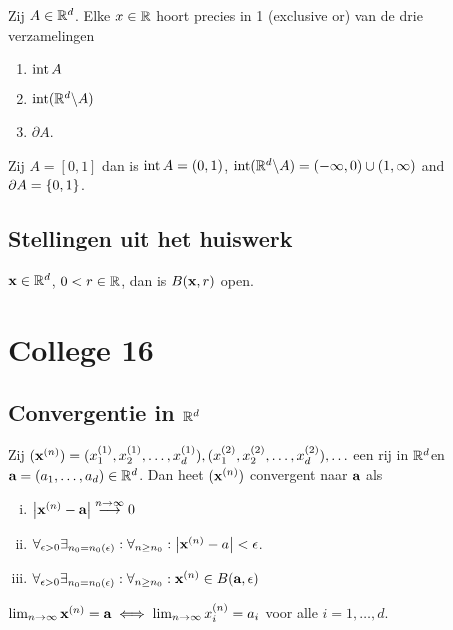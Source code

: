 \documentclass{2wa40summary}
\begin{document}
	\begin{lemma}
		Zij $A\in\mathbb{R}^d$.
		Elke $x \in \mathbb{R}$ hoort precies in 1 (exclusive or) van de drie verzamelingen
		\begin{enumerate}
			\item $\operatorname{\mathop{int}} A$
			\item $\operatorname{\mathop{int}} (\mathbb{R}^d\backslash A)$
			\item $\partial A$.
		\end{enumerate}
	\end{lemma}
	\begin{voorbeeld}
		Zij $A = [0,1]$ dan is $\operatorname{\mathop{int}} A=(0,1)$, $\operatorname{\mathop{int}} (\mathbb{R}^d\backslash A)=(-\infty,0)\cup(1,\infty)$
		and $\partial A = \lbrace0,1\rbrace$.
	\end{voorbeeld}
	
	\subsection{Stellingen uit het huiswerk}
	\begin{theorem}
		${\textbf{x}} \in \mathbb{R}^d$, $0<r\in\mathbb{R}$, dan is $B({\textbf{x}},r)$ open.
	\end{theorem}
	\newpage
	\section{College 16}
	\subsection{Convergentie in $\mathbb{R}^d$}
	\begin{define}
		Zij $({\textbf{x}}^{(n)}) = (x^{(1)}_1,x^{(1)}_2,\ldots,x^{(1)}_d), (x^{(2)}_1,x^{(2)}_2,\ldots,x^{(2)}_d), \ldots$
		een rij in $\mathbb{R}^d$en ${\textbf{a}} =(a_1, \dots ,a_d ) \in \mathbb{R}^d$. Dan heet $({\textbf{x}}^{(n)})$ convergent naar ${\textbf{a}}$ als
		\begin{enumerate}[(i)]
			\item ${\left|{\textbf{x}}^{(n)}-{\textbf{a}}\right|}\stackrel{n\to \infty}{\longrightarrow} 0$
			\item $\forall _{\epsilon >0} \exists _{n_0=n_0(\epsilon)}: \forall _{n\geq n_0} : \abs{\x\up{n} - a} < \epsilon$.
			\item $\forall _{\epsilon >0} \exists _{n_0=n_0(\epsilon)}: \forall _{n\geq n_0} : \x\up{n} \in B(\a,\epsilon )$
		\end{enumerate}
	\end{define}		
	\begin{theorem}
		$\lim_{n\to\infty}{\textbf{x}}^{(n)}={\textbf{a}} \iff \lim_{n\to\infty} x^{(n)}_{i} = a_i$ voor alle $i=1,\ldots ,d$.
	\end{theorem}
	
\end{document}

